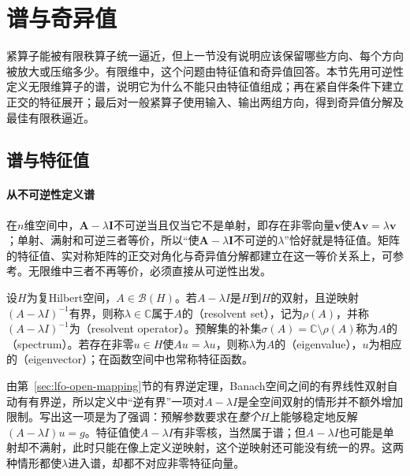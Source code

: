 
\section{谱与奇异值}
\label{sec:ose-spectrum}

紧算子能被有限秩算子统一逼近，但上一节没有说明应该保留哪些方向、每个方向被放大或压缩多少。有限维中，这个问题由特征值和奇异值回答。本节先用可逆性定义无限维算子的谱，说明它为什么不能只由特征值组成；再在紧自伴条件下建立正交的特征展开；最后对一般紧算子使用输入、输出两组方向，得到奇异值分解及最佳有限秩逼近。

\subsection{谱与特征值}
\label{sec:ose-spectrum-def}

\paragraph{从不可逆性定义谱}
在$n$维空间中，$\bm A-\lambda\bm I$不可逆当且仅当它不是单射，即存在非零向量$\bm v$使$\bm A\bm v=\lambda\bm v$；单射、满射和可逆三者等价，所以“使$\bm A-\lambda\bm I$不可逆的$\lambda$”恰好就是特征值。矩阵的特征值、实对称矩阵的正交对角化与奇异值分解都建立在这一等价关系上，可参考。无限维中三者不再等价，必须直接从可逆性出发。

\begin{definition}[谱与预解集]
\label{def:ose-spectrum}
设$H$为复Hilbert空间，$A\in\mathcal B(H)$。若$A-\lambda I$是$H$到$H$的双射，且逆映射$(A-\lambda I)^{-1}$有界，则称$\lambda\in\mathbb C$属于$A$的（resolvent set），记为$\rho(A)$，并称$(A-\lambda I)^{-1}$为（resolvent operator）。预解集的补集$\sigma(A)=\mathbb C\setminus\rho(A)$称为$A$的（spectrum）。若存在非零$u\in H$使$Au=\lambda u$，则称$\lambda$为$A$的（eigenvalue），$u$为相应的（eigenvector）；在函数空间中也常称特征函数。
\end{definition}

由第~\ref{sec:lfo-open-mapping}节的有界逆定理，Banach空间之间的有界线性双射自动有有界逆，所以定义中“逆有界”一项对$A-\lambda I$是全空间双射的情形并不额外增加限制。写出这一项是为了强调：预解参数要求在\emph{整个}$H$上能够稳定地反解$(A-\lambda I)u=g$。特征值使$A-\lambda I$有非零核，当然属于谱；但$A-\lambda I$也可能是单射却不满射，此时只能在像上定义逆映射，这个逆映射还可能没有统一的界。这两种情形都使$\lambda$进入谱，却都不对应非零特征向量。

